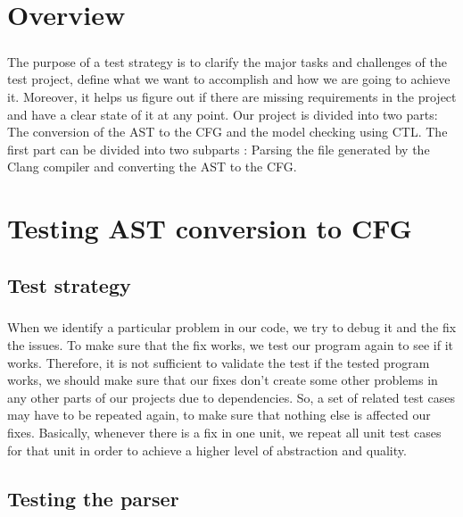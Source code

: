 \documentclass{report}
\begin{document}
\chapter{Overview}

\paragraph{}
\hspace{4mm}The purpose of a test strategy is to clarify the major tasks and challenges of the test project, define what we want to accomplish and how we are going to achieve it. Moreover, it helps us figure out if there are missing requirements in the project and have a clear state of it at any point.
Our project is divided into two parts: The conversion of the AST to the CFG and the model checking using CTL.
The first part can be divided into two subparts : Parsing the file generated by the Clang compiler and converting the AST to the CFG.

\chapter{Testing AST conversion to CFG}

\section{Test strategy}

\paragraph{}
\hspace{4mm}When we identify a particular problem in our code, we try to debug it and the fix the issues. 
To make sure that the fix works, we test our program again to see if it works. Therefore, it is not sufficient to validate the test if the tested program works, we should make sure that our fixes don't create some other problems in any other parts of our projects due to dependencies.
So, a set of related test cases may have to be repeated again, to make sure that nothing else is affected our fixes.
Basically, whenever there is a fix in one unit, we repeat all unit test cases for that unit in order to achieve a higher level of abstraction and quality.

\section{Testing the parser}
\end{document}
